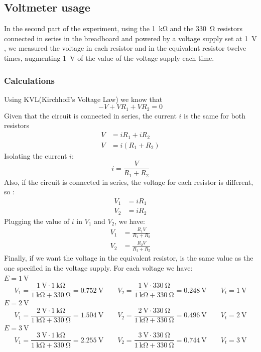 \documentclass[a4paper]{article}
\begin{document}
\subsection{Voltmeter usage}
In the second part of the experiment, using the \SI{1}{\kilo\ohm} and the \SI{330}{\ohm} resistors connected in series in the breadboard and powered by a voltage supply set at \SI{1}{\volt} , we measured the voltage in each resistor and in the equivalent resistor twelve times, augmenting \SI{1}{\volt} of the value of the voltage supply each time. 
\subsubsection{Calculations}
Using KVL(Kirchhoff’s Voltage Law) we know that 
\[-V+VR_1+VR_2=0\]
Given that the circuit is connected in series, the current $i$ is the same for both resistors
\begin{align*}
V&=iR_1+iR_2\\
V&=i(R_1+R_2)
\end{align*}
Isolating the current $i$:
\[i=\frac{V}{R_1+R_2}\]
Also, if the circuit is connected in series, the voltage for each resistor is different, so :
\begin{align*}
V_1&=iR_1\\ 
V_2&=iR_2
\end{align*}
Plugging the value of $i$ in $V_1$ and $V_2$, we have:
\begin{align*}
V_1&=\frac{R_1V}{R_1+R_2}\\ 
V_2&=\frac{R_2V}{R_1+R_2}
\end{align*}
Finally, if we want the voltage in the equivalent resistor, is the same value as the one specified in the voltage supply.
For each voltage we have:\\
$E=\SI{1}{\volt}$
\[V_1=\frac{\SI{1}{\volt}\cdot\SI{1}{\kilo\ohm}}{\SI{1}{\kilo\ohm}+\SI{330}{\ohm}}=\SI{0.752}{\volt}
\qquad
V_2=\frac{\SI{1}{\volt}\cdot\SI{330}{\ohm}}{\SI{1}{\kilo\ohm}+\SI{330}{\ohm}}=\SI{0.248}{\volt}
\qquad
V_{t}=\SI{1}{\volt}
\]
$E=\SI{2}{\volt}$
\[V_1=\frac{\SI{2}{\volt}\cdot\SI{1}{\kilo\ohm}}{\SI{1}{\kilo\ohm}+\SI{330}{\ohm}}=\SI{1.504}{\volt}
\qquad
V_2=\frac{\SI{2}{\volt}\cdot\SI{330}{\ohm}}{\SI{1}{\kilo\ohm}+\SI{330}{\ohm}}=\SI{0.496}{\volt}
\qquad
V_{t}=\SI{2}{\volt}
\]
$E=\SI{3}{\volt}$
\[V_1=\frac{\SI{3}{\volt}\cdot\SI{1}{\kilo\ohm}}{\SI{1}{\kilo\ohm}+\SI{330}{\ohm}}=\SI{2.255}{\volt}
\qquad
V_2=\frac{\SI{3}{\volt}\cdot\SI{330}{\ohm}}{\SI{1}{\kilo\ohm}+\SI{330}{\ohm}}=\SI{0.744}{\volt}
\qquad
V_{t}=\SI{3}{\volt}
\]
\end{document}

